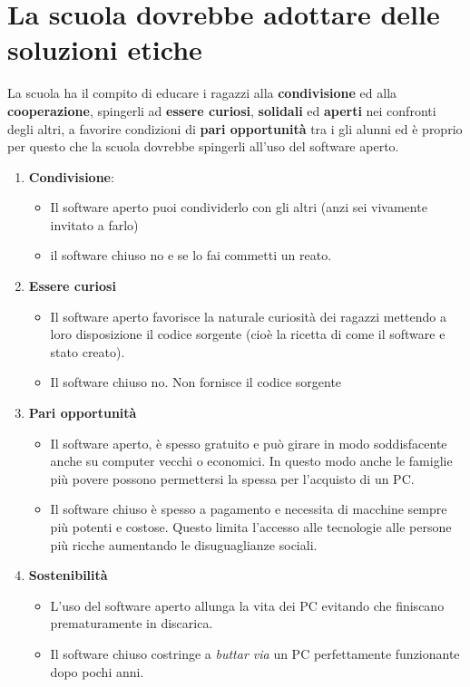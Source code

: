 \documentclass[]{article}
\begin{document}
\section{La scuola dovrebbe adottare delle soluzioni etiche}
La scuola ha il compito di educare i ragazzi alla \textbf{condivisione} ed alla \textbf{cooperazione}, spingerli ad \textbf{essere curiosi}, \textbf{solidali} ed \textbf{aperti} nei confronti degli altri, a favorire condizioni di \textbf{pari opportunità} tra i gli alunni  ed  è proprio per questo che la scuola dovrebbe spingerli all’uso del software aperto.
\begin{enumerate}
	\item \textbf{Condivisione}:
	\begin{itemize}
		\item Il software aperto puoi condividerlo con gli altri (anzi sei vivamente invitato a farlo) 
		\item il software chiuso no e se lo fai commetti un reato.
	\end{itemize}
	\item \textbf{Essere curiosi}
	\begin{itemize}
		\item Il software aperto favorisce la naturale curiosità dei ragazzi mettendo a loro disposizione il codice sorgente (cioè la ricetta di come il software e stato creato). 
		\item Il software chiuso no. Non fornisce il codice sorgente
	\end{itemize}
	\item \textbf{Pari opportunità}
	\begin{itemize}
		\item Il software aperto, è spesso gratuito e può girare in modo soddisfacente anche su computer vecchi o economici. In questo modo anche le famiglie più povere possono permettersi la spessa per l'acquisto di un PC. 
		\item Il software chiuso è spesso a pagamento e necessita di macchine sempre più potenti e costose. Questo limita l'accesso alle tecnologie alle persone più ricche aumentando le disuguaglianze sociali. 
	\end{itemize}
	\item \textbf{Sostenibilità}
	\begin{itemize}
		\item L'uso del software aperto allunga la vita dei PC evitando che finiscano prematuramente in discarica.
		\item Il software chiuso costringe a \textit{buttar via} un PC perfettamente funzionante dopo pochi anni.  
	\end{itemize}
\end{enumerate}
\end{document}
